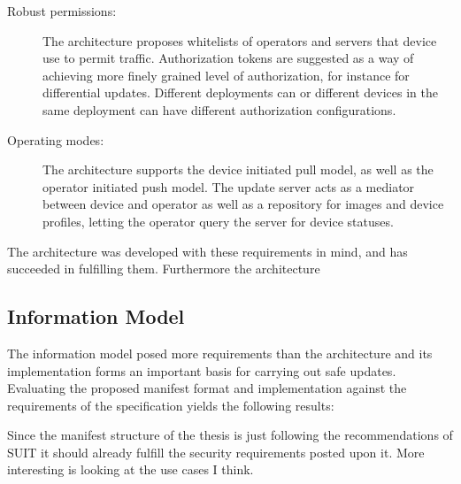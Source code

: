 \documentclass[0-thesis.tex]{subfiles}
\begin{document}
\begin{description}
    \item[Robust permissions:]
        The architecture proposes whitelists of operators and servers that device use to
        permit traffic. Authorization tokens are suggested as a way of achieving more
        finely grained level of authorization, for instance for differential updates.
        Different deployments can or different devices in the same deployment can have
        different authorization configurations.

    \item[Operating modes:]
        The architecture supports the device initiated pull model, as well as the operator
        initiated push model. The update server acts as a mediator between device and
        operator as well as a repository for images and device profiles, letting the
        operator query the server for device statuses.
\end{description}

The architecture was developed with these requirements in mind, and has succeeded in
fulfilling them. Furthermore the architecture 
  
\subsection{Information Model}
\label{ssec:information-evaluation}
The information model posed more requirements than the architecture and its implementation
forms an important basis for carrying out safe updates. Evaluating the proposed manifest
format and implementation against the requirements of the specification yields the
following results:

Since the manifest structure of the thesis is just following the recommendations of SUIT
it should already fulfill the security requirements posted upon it. More interesting is
looking at the use cases I think.
\end{document}
